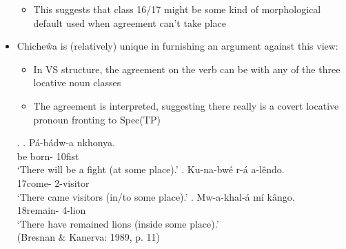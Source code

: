 \documentclass[letterpaper,10pt]{handout_nick}
\begin{document}
\begin{itemize}
\begin{itemize}
\item This suggests that class 16/17 might be some kind of morphological default used when agreement can't take place
\end{itemize} 
\item Chiche\^wa is (relatively) unique in furnishing an argument against this view:
\begin{itemize}
\item In VS structure, the agreement on the verb can be with any of the three locative noun classes
\item The agreement is interpreted, suggesting there really is a covert locative pronoun fronting to Spec(TP)
\end{itemize}
\ex. \ag. P\'a-b\'adw-a nkhonya.\\
{be born-} 10fist\\
`There will be a fight (at some place).'
\bg. Ku-na-bw\'e r-\'a a-l\v{e}ndo.\\
17come- 2-visitor\\
`There came visitors (in/to some place).'
\bg. Mw-a-khal-\'a m\'i k\^ango.\\
18remain- 4-lion\\
`There have remained lions (inside some place).'\\
(Bresnan \& Kanerva: 1989, p. 11)

\end{itemize}
\end{document}

